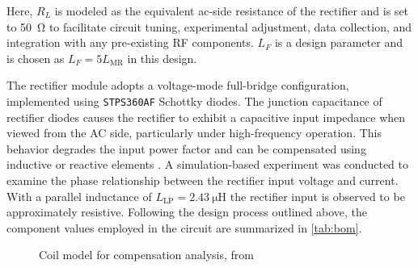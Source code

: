 \documentclass[journal, 9pt, letterpaper, english]{IEEEtran}[2015/08/26]
\begin{document}
Here, $R_L$ is modeled as the equivalent ac-side resistance of the rectifier and is set to \qty{50}{\ohm} to facilitate circuit tuning, experimental adjustment, data collection, and integration with any pre-existing RF components.
$L_F$ is a design parameter and is chosen as $L_F = 5L_{\mathrm{MR}}$ in this design.

The rectifier module adopts a voltage-mode full-bridge configuration, implemented using \verb|STPS360AF| Schottky diodes.
The junction capacitance of rectifier diodes causes the rectifier to exhibit a capacitive input impedance when viewed from the AC side, particularly under high-frequency operation. This behavior degrades the input power factor and can be compensated using inductive or reactive elements \cite{10833657}.
A simulation-based experiment was conducted to examine the phase relationship between the rectifier input voltage and current. With a parallel inductance of $L_{\mathrm{LP}} = \qty{2.43}{\micro\henry}$ the rectifier input is observed to be approximately resistive.
Following the design process outlined above, the component values employed in the circuit are summarized in \cref{tab:bom}.
\begin{table}[t]
	\centering
	
	\caption{General component list for PPT WPT DC--DC Converter}
	\label{tab:bom}
\end{table}
\begin{figure}[!tb]
	\centering
	
	\caption{Coil model for compensation analysis, from \cite{10833657}}
	\label{fig:coilmodel}
\end{figure}
\end{document}
